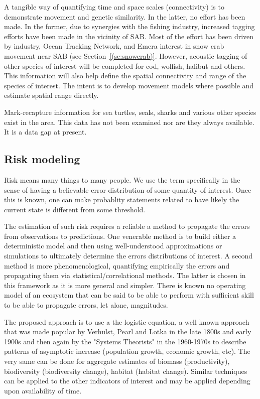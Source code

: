 \documentclass[letterpaper,portrait,11pt]{scrartcl}
\numberwithin{equation}{section}		%
\numberwithin{figure}{section}		%
\numberwithin{table}{section}				%
\begin{document}
A tangible way of quantifying time and space scales (connectivity) is to demonstrate movement and genetic similarity. In the latter, no effort has been made.  In the former, due to synergies with the fishing industry, increased tagging efforts have been made in the vicinity of SAB. Most of the effort has been driven by industry, Ocean Tracking Network, and Emera interest in snow crab movement near SAB (see Section~\ref{(se:snowcrab)}. However, acoustic tagging of other species of interest will be completed for cod, wolfish, halibut and others. This information will also help define the spatial connectivity and range of the species of interest. The intent is to develop movement models where possible and estimate spatial range directly.  

Mark-recapture information for sea turtles, seals, sharks and various other species exist in the area. This data has not been examined nor are they always available. It is a data gap at present. 


\subsection{Risk modeling}
\label{sec:riskapproach}

Risk means many things to many people. We use the term specifically in the sense of having a believable error distribution of some quantity of interest. Once this is known, one can make probablity statements related to have likely the current state is different from some threshold. 

The estimation of such risk requires a reliable a method to propagate the errors from observations to predictions. One venerable method is to build either a deterministic model and then using well-understood approximations or simulations to ultimately determine the errors distributions of interest. A second method is more phenomenological, quantifying empirically the errors and propagating them via statistical/correlational methods. The latter is chosen in this framework as it is more general and simpler. There is known no operating model of an ecosystem that can be said to be able to perform with sufficient skill to be able to propagate errors, let alone, magnitudes. 

The proposed approach is to use a the logistic equation, a well known approach that was made popular by Verhulst, Pearl and Lotka in the late 1800s and early 1900s and then again by the "Systems Theorists" in the 1960-1970s to describe patterns of asymptotic increase (population growth, economic growth, etc).  The very same can be done for aggregate estimates of biomass (productivity), biodiversity (biodiversity change), habitat (habitat change). Similar techniques can be applied to the other indicators of interest and may be applied depending upon availability of time.
\end{document}
